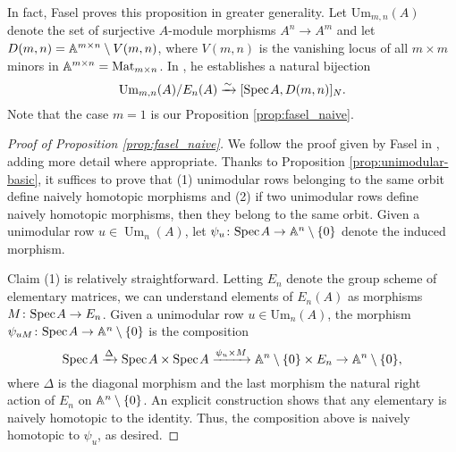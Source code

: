 \begin{remark}
    In fact, Fasel proves this proposition in greater generality. Let $\mathrm{Um}_{m,n}(A)$ denote the set of surjective $A$-module morphisms $A^n \to A^m$ and let $D(m,n) = \mathbb{A}^{m \times n}\setminus V(m,n)$, where $V(m,n)$ is the vanishing locus of all $m \times m$ minors in $\mathbb{A}^{m \times n} = \operatorname{Mat}_{m \times n}$. In \cite[Theorem 2.1]{Fasel_2010}, he establishes a natural bijection
    \[
    \operatorname{Um}_{m,n}(A)/E_n(A) \xrightarrow{\sim} [\text{Spec}\hspace{0.1em} A, D(m,n)]_{N}.
    \]
    Note that the case $m = 1$ is our Proposition \ref{prop:fasel_naive}. 
\end{remark}

\begin{proof}[Proof of Proposition \ref{prop:fasel_naive}]
    We follow the proof given by Fasel in \cite[Theorem 2.1]{Fasel_2010}, adding more detail where appropriate. Thanks to Proposition \ref{prop:unimodular-basic}, it suffices to prove that (1) unimodular rows belonging to the same orbit define naively homotopic morphisms and (2) if two unimodular rows define naively homotopic morphisms, then they belong to the same orbit. Given a unimodular row $u \in \operatorname{Um}_n(A)$, let $\psi_u\colon \text{Spec}\hspace{0.1em} A \to \mathbb{A}^n\setminus\{0\}$ denote the induced morphism. 

    Claim (1) is relatively straightforward. Letting $E_n$ denote the group scheme of elementary matrices, we can understand elements of $E_n(A)$ as morphisms $M\colon \text{Spec}\hspace{0.1em} A \to E_n$. Given a unimodular row $u \in \mathrm{Um}_n(A)$, the morphism $\psi_{uM}\colon \text{Spec}\hspace{0.1em} A \to \mathbb{A}^n\setminus\{0\}$ is the composition
    \[
    \text{Spec}\hspace{0.1em} A \xrightarrow{\Delta} \text{Spec}\hspace{0.1em} A \times \text{Spec}\hspace{0.1em} A \xrightarrow{\psi_u \times M} \mathbb{A}^n\setminus\{0\} \times E_n \to \mathbb{A}^n \setminus \{0\}, 
    \]
    where $\Delta$ is the diagonal morphism and the last morphism the natural right action of $E_n$ on $\mathbb{A}^n \setminus\{0\}$. An explicit construction shows that any elementary is naively homotopic to the identity. Thus, the composition above is naively homotopic to $\psi_u$, as desired.
    

\end{proof}
